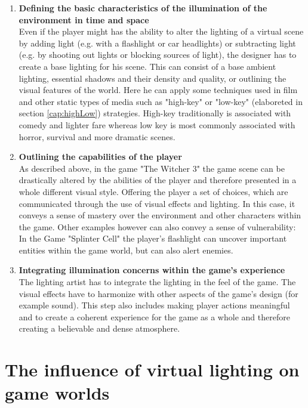 \begin{enumerate}
    \item \textbf{Defining the basic characteristics of the illumination of the environment in time and space}\\
    Even if the player might has the ability to alter the lighting of a virtual scene by adding light (e.g. with a flashlight or car headlights) or subtracting light (e.g. by shooting out lights or blocking sources of light), the designer has to create a base lighting for his scene. This can consist of a base ambient lighting, essential shadows and their density and quality, or outlining the visual features of the world. Here he can apply some techniques used in film and other static types of media such as "high-key" or "low-key" (elaboreted in section \ref{cap:highLow}) strategies. High-key traditionally is associated with comedy and lighter fare whereas low key is most commonly associated with horror, survival and more dramatic scenes. 
    
    \item \textbf{Outlining the capabilities of the player}\\
    As described above, in the game "The Witcher 3" the game scene can be drastically altered by the abilities of the player and therefore presented in a whole different visual style. Offering the player a set of choices, which are communicated through the use of visual effects and lighting. In this case, it conveys a sense of mastery over the environment and other characters within the game. Other examples however can also convey a sense of vulnerability: In the Game "Splinter Cell" the player's flashlight can uncover important entities within the game world, but can also alert enemies.
    
    \item \textbf{Integrating illumination concerns within the game's experience}\\
    The lighting artist has to integrate the lighting in the feel of the game. The visual effects have to harmonize with other aspects of the game's design (for example sound). This step also includes making player actions meaningful and to create a coherent experience for the game as a whole and therefore creating a believable and dense atmosphere. 
    
\end{enumerate}
\newpage
\section{The influence of virtual lighting on game worlds} \label{cap:simu}

